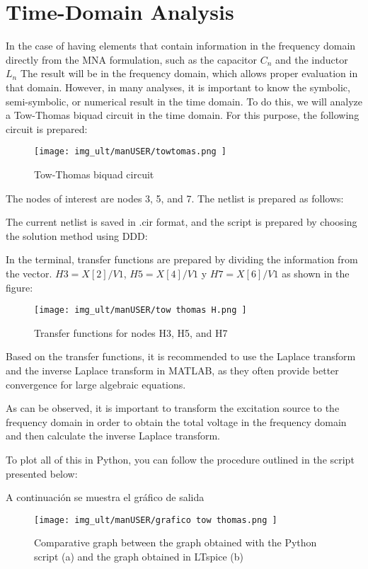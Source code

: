 \section{Time-Domain Analysis}
	In the case of having elements that contain information in the frequency domain directly from the MNA formulation, such as the capacitor
 $C_{n}$ and the inductor $L_{n}$ The result will be in the frequency domain, which allows proper evaluation in that domain. However, in many analyses, it is important to know the symbolic, semi-symbolic, or numerical result in the time domain. To do this, we will analyze a Tow-Thomas biquad circuit in the time domain. For this purpose, the following circuit is prepared:

\begin{figure}[H]
	\centering\texttt{[image: img\_ult/manUSER/towtomas.png
	]}
	\caption{Tow-Thomas biquad circuit}
	\label{img:Tow thomas}
\end{figure} 

The nodes of interest are nodes 3, 5, and 7. The netlist is prepared as follows:


The current netlist is saved in .cir format, and the script is prepared by choosing the solution method using DDD:



In the terminal, transfer functions are prepared by dividing the information from the vector. $H3=X[2]/V1$, $H5=X[4]/V1$ y $H7=X[6]/V1$ as shown in the figure:

\begin{figure}[H]
	\centering\texttt{[image: img\_ult/manUSER/tow thomas H.png
	]}
	\caption{Transfer functions for nodes H3, H5, and H7}
	\label{img:Tow thomas H}
\end{figure} 

Based on the transfer functions, it is recommended to use the Laplace transform and the inverse Laplace transform in MATLAB, as they often provide better convergence for large algebraic equations.



As can be observed, it is important to transform the excitation source to the frequency domain in order to obtain the total voltage in the frequency domain and then calculate the inverse Laplace transform.

To plot all of this in Python, you can follow the procedure outlined in the script presented below:



A continuación se muestra el gráfico de salida 

\begin{figure}[H]
	\centering\texttt{[image: img\_ult/manUSER/grafico tow thomas.png
	]}
	\caption{Comparative graph between the graph obtained with the Python script (a) and the graph obtained in LTspice (b)}
	\label{img:Tow thomas grafico}
\end{figure} 

